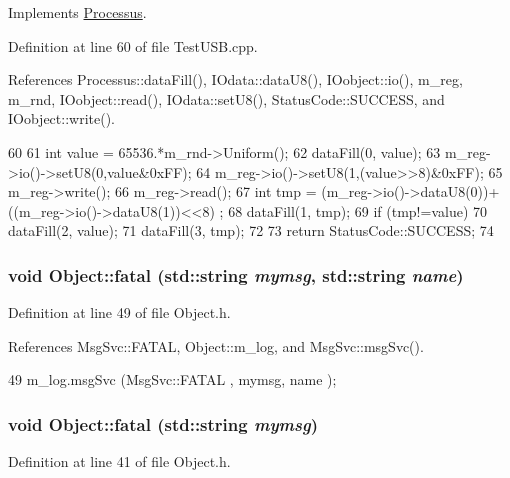 Implements \hyperlink{classProcessus_a63767a63a1fb0055c5aa45b21a4a5d58}{Processus}.

Definition at line 60 of file TestUSB.cpp.

References Processus::dataFill(), IOdata::dataU8(), IOobject::io(), m\_\-reg, m\_\-rnd, IOobject::read(), IOdata::setU8(), StatusCode::SUCCESS, and IOobject::write().


\begin{DoxyCode}
60                               {
61   int value = 65536.*m_rnd->Uniform();
62   dataFill(0, value);
63   m_reg->io()->setU8(0,value&0xFF);
64   m_reg->io()->setU8(1,(value>>8)&0xFF);
65   m_reg->write();
66   m_reg->read();
67   int tmp = (m_reg->io()->dataU8(0))+((m_reg->io()->dataU8(1))<<8) ;
68   dataFill(1, tmp);
69   if (tmp!=value){
70     dataFill(2, value);
71     dataFill(3, tmp);
72   }
73   return StatusCode::SUCCESS;
74 }
\end{DoxyCode}
\hypertarget{classObject_ae62acd3d09f716220f75f252dc38bc9a}{
\subsubsection[{fatal}]{\setlength{\rightskip}{0pt plus 5cm}void Object::fatal (std::string {\em mymsg}, \/  std::string {\em name})}}
\label{classObject_ae62acd3d09f716220f75f252dc38bc9a}


Definition at line 49 of file Object.h.

References MsgSvc::FATAL, Object::m\_\-log, and MsgSvc::msgSvc().


\begin{DoxyCode}
49 { m_log.msgSvc (MsgSvc::FATAL   , mymsg, name ); }
\end{DoxyCode}
\hypertarget{classObject_aad5a16aac7516ce65bd5ec02ab07fc80}{
\subsubsection[{fatal}]{\setlength{\rightskip}{0pt plus 5cm}void Object::fatal (std::string {\em mymsg})}}
\label{classObject_aad5a16aac7516ce65bd5ec02ab07fc80}


Definition at line 41 of file Object.h.

